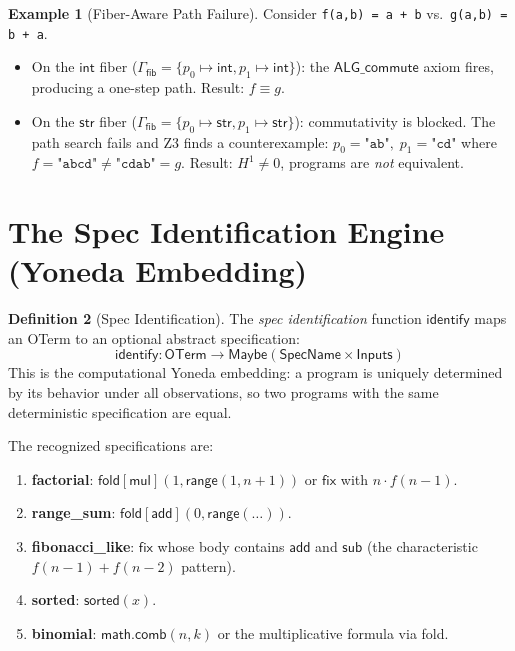\documentclass[11pt,a4paper]{report}
\theoremstyle{definition}
\newtheorem{definition}{Definition}[chapter]
\newtheorem{example}[definition]{Example}
\theoremstyle{plain}
\newcommand{\fold}{\mathsf{fold}}
\newcommand{\Hone}{H^1}
\begin{document}
\begin{example}[Fiber-Aware Path Failure]
Consider \texttt{f(a,b) = a + b} vs.\ \texttt{g(a,b) = b + a}.
\begin{itemize}
  \item On the $\mathsf{int}$ fiber ($\Gamma_{\mathsf{fib}} = \{p_0
    \mapsto \mathsf{int}, p_1 \mapsto \mathsf{int}\}$): the
    $\mathsf{ALG\_commute}$ axiom fires, producing a one-step path.
    Result: $f \equiv g$.
  \item On the $\mathsf{str}$ fiber ($\Gamma_{\mathsf{fib}} = \{p_0
    \mapsto \mathsf{str}, p_1 \mapsto \mathsf{str}\}$): commutativity
    is blocked.  The path search fails and Z3 finds a counterexample:
    $p_0 = \texttt{"ab"},\; p_1 = \texttt{"cd"}$ where
    $f = \texttt{"abcd"} \neq \texttt{"cdab"} = g$.
    Result: $\Hone \neq 0$, programs are \emph{not} equivalent.
\end{itemize}
\end{example}

\section{The Spec Identification Engine (Yoneda Embedding)}
\label{sec:spec-identification}

\begin{definition}[Spec Identification]
\label{def:spec-identification}
The \emph{spec identification} function $\mathsf{identify}$ maps
an OTerm to an optional abstract specification:
\[
  \mathsf{identify} : \mathsf{OTerm} \longrightarrow
  \mathsf{Maybe}(\mathsf{SpecName} \times \mathsf{Inputs})
\]
This is the computational Yoneda embedding: a program is uniquely
determined by its behavior under all observations, so two programs
with the same deterministic specification are equal.

The recognized specifications are:
\begin{enumerate}
  \item \textbf{factorial}: $\fold[\mathsf{mul}](1,
    \mathsf{range}(1, n{+}1))$ or $\mathsf{fix}$ with
    $n \cdot f(n{-}1)$.
  \item \textbf{range\_sum}: $\fold[\mathsf{add}](0,
    \mathsf{range}(\ldots))$.
  \item \textbf{fibonacci\_like}: $\mathsf{fix}$ whose body
    contains $\mathsf{add}$ and $\mathsf{sub}$ (the characteristic
    $f(n{-}1) + f(n{-}2)$ pattern).
  \item \textbf{sorted}: $\mathsf{sorted}(x)$.
  \item \textbf{binomial}: $\mathsf{math.comb}(n, k)$ or the
    multiplicative formula via fold.
\end{enumerate}
\end{definition}
\end{document}
